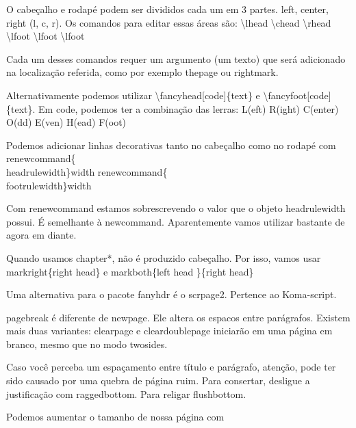 \documentclass[a4paper, 12pts]{book}
\begin{document}
O cabeçalho e rodapé podem ser divididos cada um em 3 partes.
left, center, right (l, c, r).
Os comandos para editar essas áreas são:
\textbackslash lhead \textbackslash chead \textbackslash rhead 
\textbackslash lfoot \textbackslash lfoot \textbackslash lfoot 

Cada um desses comandos requer um argumento (um texto) que será adicionado
na localização referida, como por exemplo thepage ou rightmark.

Alternativamente podemos utilizar \textbackslash fancyhead[code]\{text\} e
\textbackslash fancyfoot[code]\{text\}.
Em code, podemos ter a combinação das lerras:
L(eft) R(ight) C(enter) O(dd) E(ven) H(ead) F(oot)

Podemos adicionar linhas decorativas tanto no cabeçalho como no rodapé com
\textback renewcommand\{\\headrulewidth\}{width}
\textback renewcommand\{\\footrulewidth\}{width}

Com renewcommand estamos sobrescrevendo o valor que o objeto headrulewidth possui.
É semelhante à newcommand.
Aparentemente vamos utilizar bastante de agora em diante.

Quando usamos chapter*, não é produzido cabeçalho.
Por isso, vamos usar markright\{right head\} e markboth\{left head \}\{right head\}

Uma alternativa para o pacote fanyhdr é o scrpage2.
Pertence ao Koma-script.

\textback pagebreak é diferente de newpage. Ele altera os espacos entre parágrafos.
Existem mais duas variantes: clearpage e cleardoublepage iniciarão
em uma página em branco, mesmo que no modo twosides.

Caso você perceba um espaçamento entre título e parágrafo,
atenção, pode ter sido causado por uma quebra de página ruim.
Para consertar, desligue a justificação com raggedbottom.
Para religar flushbottom.

Podemos aumentar o tamanho de nossa página com 

\end{document}
